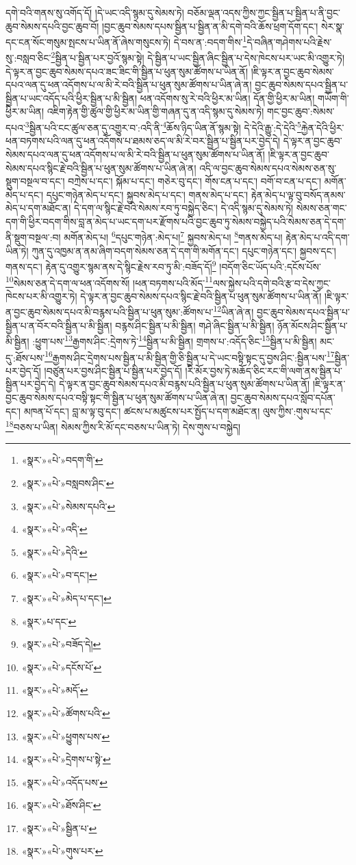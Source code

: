 དགེ་བའི་གནས་སུ་འགོད་དོ། །དེ་ཡང་འདི་སྙམ་དུ་སེམས་ཏེ། བཅོམ་ལྡན་འདས་ཀྱིས་ཀྱང་སྦྱིན་པ་སྦྱིན་པ་ནི་བྱང་ཆུབ་སེམས་དཔའི་བྱང་ཆུབ་བོ། །བྱང་ཆུབ་སེམས་དཔས་སྦྱིན་པ་སྦྱིན་ན་མི་དགེ་བའི་ཆོས་ཕྲག་དོག་དང་། སེར་སྣ་དང་ངན་སོང་གསུམ་སྤངས་པ་ཡིན་ནོ་ཞེས་གསུངས་ཏེ། དེ་བས་ན་:བདག་གིས་\footnote{«སྣར་»«པེ་»བདག་གི་}དེ་བཞིན་གཤེགས་པའི་རྗེས་སུ་:བསླབ་ཅིང་\footnote{«སྣར་»«པེ་»བསླབས་ཤིང་}སྦྱིན་པ་སྦྱིན་པར་བྱའོ་སྙམ་སྟེ། དེ་སྦྱིན་པ་ཡང་སྦྱིན་ཞིང་སྦྱིན་པ་དེས་ཁེངས་པར་ཡང་མི་འགྱུར་ཏེ། དེ་ལྟར་ན་བྱང་ཆུབ་སེམས་དཔའ་ཟང་ཟིང་གི་སྦྱིན་པ་ཕུན་སུམ་ཚོགས་པ་ཡིན་ནོ། །ཇི་ལྟར་ན་བྱང་ཆུབ་སེམས་དཔའ་ལན་དུ་ཕན་འདོགས་པ་ལ་མི་རེ་བའི་སྦྱིན་པ་ཕུན་སུམ་ཚོགས་པ་ཡིན་ཞེ་ན། བྱང་ཆུབ་སེམས་དཔའ་སྦྱིན་པ་སྦྱིན་པ་ཡང་འདོད་པའི་ཕྱིར་སྦྱིན་པ་མི་སྦྱིན། ཕན་འདོགས་སུ་རེ་བའི་ཕྱིར་མ་ཡིན། དོན་གྱི་ཕྱིར་མ་ཡིན། གཡོག་གི་ཕྱིར་མ་ཡིན། འཇིག་རྟེན་གྱི་ཚུལ་གྱི་ཕྱིར་མ་ཡིན་གྱི་གཞན་དུ་ན་འདི་སྙམ་དུ་སེམས་ཏེ། གང་བྱང་ཆུབ་:སེམས་དཔའ་\footnote{«སྣར་»«པེ་»སེམས་དཔའི་}སྦྱིན་པའི་ངང་ཚུལ་ཅན་དུ་འགྱུར་བ་:འདི་ནི་\footnote{«སྣར་»«པེ་»འདི་}ཆོས་ཉིད་ཡིན་ནོ་སྙམ་སྟེ། དེ་དེའི་རྒྱུ་:དེ་དེའི་\footnote{«སྣར་»«པེ་»དེའི་}རྐྱེན་དེའི་ཕྱིར་ཕན་བཏགས་པའི་ལན་དུ་ཕན་འདོགས་པ་ཐམས་ཅད་ལ་མི་རེ་བར་སྦྱིན་པ་སྦྱིན་པར་བྱེད་དེ། དེ་ལྟར་ན་བྱང་ཆུབ་སེམས་དཔའ་ལན་དུ་ཕན་འདོགས་པ་ལ་མི་རེ་བའི་སྦྱིན་པ་ཕུན་སུམ་ཚོགས་པ་ཡིན་ནོ། །ཇི་ལྟར་ན་བྱང་ཆུབ་སེམས་དཔའ་སྙིང་རྗེ་བའི་སྦྱིན་པ་ཕུན་སུམ་ཚོགས་པ་ཡིན་ཞེ་ན། འདི་ལ་བྱང་ཆུབ་སེམས་དཔའ་སེམས་ཅན་སུ་སྡུག་བསྔལ་བ་དང་། བཀྲེས་པ་དང་། སྐོམ་པ་དང་། གཅེར་བུ་དང་། གོས་ངན་པ་དང་། བགོ་བ་ངན་པ་དང་། མགོན་མེད་པ་དང་། དཔུང་གཉེན་མེད་པ་དང་། སྐྱབས་མེད་པ་དང་། གནས་མེད་པ་དང་། རྟེན་མེད་པ་ལྟ་བུ་བསོད་ནམས་མེད་པ་དག་མཐོང་ན། དེ་དག་ལ་སྙིང་རྗེ་བའི་སེམས་རབ་ཏུ་བསྐྱེད་ཅིང་། དེ་འདི་སྙམ་དུ་སེམས་ཏེ། སེམས་ཅན་གང་དག་གི་ཕྱིར་བདག་གིས་བླ་ན་མེད་པ་ཡང་དག་པར་རྫོགས་པའི་བྱང་ཆུབ་ཏུ་སེམས་བསྐྱེད་པའི་སེམས་ཅན་དེ་དག་ནི་སྡུག་བསྔལ་:བ། མགོན་མེད་པ། \footnote{«སྣར་»«པེ་»བ་དང་།  }དཔུང་གཉེན་:མེད་པ།\footnote{«སྣར་»«པེ་»མེད་པ་དང་།} སྐྱབས་མེད་པ། \footnote{«སྣར་»པ་དང་}གནས་མེད་པ། རྟེན་མེད་པ་འདི་དག་ཡིན་ཏེ། ཀུན་དུ་འཁྱམ་ན་ནམ་ཞིག་བདག་སེམས་ཅན་དེ་དག་གི་མགོན་དང་། དཔུང་གཉེན་དང་། སྐྱབས་དང་། གནས་དང་། རྟེན་དུ་འགྱུར་སྙམ་ནས་དེ་སྙིང་རྗེས་རབ་ཏུ་མི་:བཟོད་དོ།\footnote{«སྣར་»«པེ་»བཟོད་དེ།} །བདོག་ཅིང་ཡོད་པའི་:དངོས་པོས་\footnote{«སྣར་»«པེ་»དངོས་པོ་}སེམས་ཅན་དེ་དག་ལ་ཕན་འདོགས་སོ། །ཕན་བཏགས་པའི་མོད་\footnote{«སྣར་»«པེ་»མདོ་}ལས་སྐྱེས་པའི་དགེ་བའི་རྩ་བ་དེས་ཀྱང་ཁེངས་པར་མི་འགྱུར་ཏེ། དེ་ལྟར་ན་བྱང་ཆུབ་སེམས་དཔའ་སྙིང་རྗེ་བའི་སྦྱིན་པ་ཕུན་སུམ་ཚོགས་པ་ཡིན་ནོ། །ཇི་ལྟར་ན་བྱང་ཆུབ་སེམས་དཔའ་མི་བརྙས་པའི་སྦྱིན་པ་ཕུན་སུམ་:ཚོགས་པ་\footnote{«སྣར་»«པེ་»ཚོགས་པའི་}ཡིན་ཞེ་ན། བྱང་ཆུབ་སེམས་དཔའ་སྦྱིན་པ་སྦྱིན་པ་ན་བོར་བའི་སྦྱིན་པ་མི་སྦྱིན། བརྙས་ཤིང་སྦྱིན་པ་མི་སྦྱིན། གཤེ་ཞིང་སྦྱིན་པ་མི་སྦྱིན། ཉོན་མོངས་ཤིང་སྦྱིན་པ་མི་སྦྱིན། :ཕྱུག་པས་\footnote{«སྣར་»«པེ་»ཕྱུགས་པས་}རྒྱགས་ཤིང་:དྲེགས་ཏེ་\footnote{«སྣར་»«པེ་»དྲེགས་པ་སྟེ་}སྦྱིན་པ་མི་སྦྱིན། གྲགས་པ་:འདོད་ཅིང་\footnote{«སྣར་»«པེ་»འདོད་པས་}སྦྱིན་པ་མི་སྦྱིན། མང་དུ་:ཐོས་པས་\footnote{«སྣར་»«པེ་»ཐོས་ཤིང་}རྒྱགས་ཤིང་དྲེགས་པས་སྦྱིན་པ་མི་སྦྱིན་གྱི་ཅི་སྦྱིན་པ་དེ་ཡང་བསྟི་སྟང་དུ་བྱས་ཤིང་:སྦྱིན་པས་\footnote{«སྣར་»«པེ་»སྦྱིན་པ་}སྦྱིན་པར་བྱེད་དོ། །བཙུན་པར་བྱས་ཤིང་སྦྱིན་པ་སྦྱིན་པར་བྱེད་དོ། །རི་མོར་བྱས་ཏེ་མཆོད་ཅིང་རང་གི་ལག་ནས་སྦྱིན་པ་སྦྱིན་པར་བྱེད་དེ། དེ་ལྟར་ན་བྱང་ཆུབ་སེམས་དཔའ་མི་བརྙས་པའི་སྦྱིན་པ་ཕུན་སུམ་ཚོགས་པ་ཡིན་ནོ། །ཇི་ལྟར་ན་བྱང་ཆུབ་སེམས་དཔའ་བསྟི་སྟང་གི་སྦྱིན་པ་ཕུན་སུམ་ཚོགས་པ་ཡིན་ཞེ་ན། བྱང་ཆུབ་སེམས་དཔའ་སློབ་དཔོན་དང་། མཁན་པོ་དང་། བླ་མ་ལྟ་བུ་དང་། ཚངས་པ་མཚུངས་པར་སྤྱོད་པ་དག་མཐོང་ན། ལུས་ཀྱིས་:གུས་པ་དང་\footnote{«སྣར་»«པེ་»གུས་པར་}བཅས་པ་ཡིན། སེམས་ཀྱིས་རི་མོ་དང་བཅས་པ་ཡིན་ཏེ། དེས་གུས་པ་བསྐྱེད། 